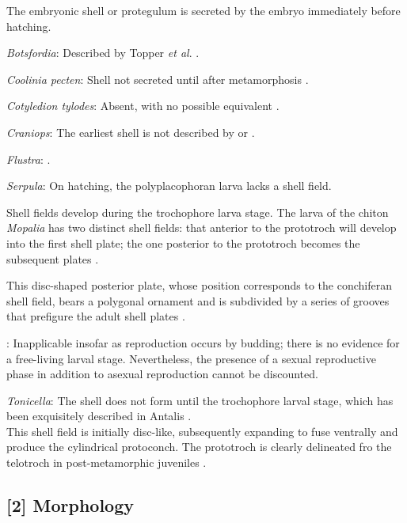 \documentclass[openany]{book}
\theoremstyle{definition}
\theoremstyle{definition}
\theoremstyle{definition}
\theoremstyle{remark}
\begin{document}
The embryonic shell or protegulum is secreted by the embryo immediately
before hatching.

\hypertarget{Botsfordia-coding-1}{}
\emph{Botsfordia}: Described by Topper \emph{et al}.
\citeyearpar{Topper2013Reappraisalof}.

\hypertarget{Coolinia_pecten-coding-1}{}
\emph{Coolinia pecten}: Shell not secreted until after metamorphosis
\citep{Popov2010Earliestontogeny}.

\hypertarget{Cotyledion_tylodes-coding-1}{}
\emph{Cotyledion tylodes}: Absent, with no possible equivalent
\citep{Nielsen1966}.

\hypertarget{Craniops-coding-1}{}
\emph{Craniops}: The earliest shell is not described by
\citet{Hanken1985Thetaxonomy} or \citet{Watkins2002Newrecord}.

\hypertarget{Flustra-coding-1}{}
\emph{Flustra}: \citet{Reed1982}.

\hypertarget{Serpula-coding-1}{}
\emph{Serpula}: On hatching, the polyplacophoran larva lacks a shell
field.

Shell fields develop during the trochophore larva stage. The larva of
the chiton \emph{Mopalia} has two distinct shell fields: that anterior
to the prototroch will develop into the first shell plate; the one
posterior to the prototroch becomes the subsequent plates
\citep{Wanninger2002C}.

This disc-shaped posterior plate, whose position corresponds to the
conchiferan shell field, bears a polygonal ornament and is subdivided by
a series of grooves that prefigure the adult shell plates
\citep{Wanninger2002C}.

\hypertarget{TAXLABELS-coding-1}{}
: Inapplicable insofar as reproduction occurs by budding; there is no
evidence for a free-living larval stage. Nevertheless, the presence of a
sexual reproductive phase in addition to asexual reproduction cannot be
discounted.

\hypertarget{Tonicella-coding-1}{}
\emph{Tonicella}: The shell does not form until the trochophore larval
stage, which has been exquisitely described in Antalis
\citep{Wanninger2001}.\\
This shell field is initially disc-like, subsequently expanding to fuse
ventrally and produce the cylindrical protoconch. The prototroch is
clearly delineated fro the telotroch in post-metamorphic juveniles
\citep{Wanninger2001}.

\subsection*{{[}2{]} Morphology}\label{morphology}
\end{document}
